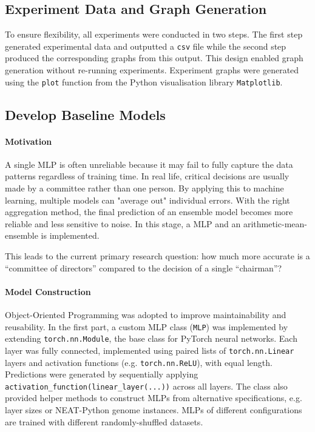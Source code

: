 \subsection{Experiment Data and Graph Generation}
To ensure flexibility, all experiments were conducted in two steps. The first step generated experimental data and outputted a \texttt{csv} file while the second step produced the corresponding graphs from this output. This design enabled graph generation without re-running experiments. Experiment graphs were generated using the \texttt{plot} function from the Python visualisation library \texttt{Matplotlib}. 


\subsection{Develop Baseline Models}
\label{subsec:stage_1}
\label{subsec:stage_2}
\paragraph{Motivation}
A single MLP is often unreliable because it may fail to fully capture the data patterns regardless of training time. In real life, critical decisions are usually made by a committee rather than one person. By applying this to machine learning, multiple models can "average out" individual errors. With the right aggregation method, the final prediction of an ensemble model becomes more reliable and less sensitive to noise. In this stage, a MLP and an arithmetic-mean-ensemble is implemented. 

This leads to the current primary research question: how much more accurate is a ``committee of directors'' compared to the decision of a single ``chairman''? 


\paragraph{Model Construction}
Object-Oriented Programming was adopted to improve maintainability and reusability. In the first part, a custom MLP class (\texttt{MLP}) was implemented by extending \texttt{torch.nn.Module}, the base class for PyTorch neural networks. Each layer was fully connected, implemented using paired lists of \texttt{torch.nn.Linear} layers and activation functions (e.g. \texttt{torch.nn.ReLU}), with equal length. Predictions were generated by sequentially applying \texttt{activation\_function(linear\_layer(...))} across all layers. The class also provided helper methods to construct MLPs from alternative specifications, e.g. layer sizes or NEAT-Python genome instances. MLPs of different configurations are trained with different randomly-shuffled datasets. 

